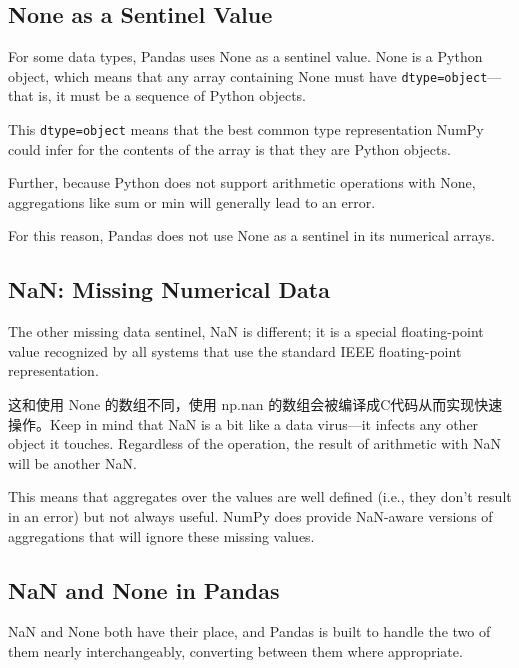 \subsection*{None as a Sentinel Value}
For some data types, Pandas uses None as a sentinel value. None is a Python object,
which means that any array containing None must have \verb|dtype=object|—that is, it
must be a sequence of Python objects.

This \verb|dtype=object| means that the best common type representation NumPy could
infer for the contents of the array is that they are Python objects. 

Further, because Python does not support arithmetic operations with None, aggregations like sum or min will generally lead to an error.

For this reason, Pandas does not use None as a sentinel in its numerical arrays.
\subsection*{NaN: Missing Numerical Data}

The other missing data sentinel, NaN is different; it is a special floating-point value
recognized by all systems that use the standard IEEE floating-point representation.

这和使用 None 的数组不同，使用 np.nan 的数组会被编译成C代码从而实现快速操作。Keep in mind that NaN is a bit like a data virus—it infects any other
object it touches. Regardless of the operation, the result of arithmetic with NaN will be another NaN.

This means that aggregates over the values are well defined (i.e., they don't result in
an error) but not always useful. NumPy does provide NaN-aware versions of aggregations that will ignore
these missing values.


\subsection*{NaN and None in Pandas}
NaN and None both have their place, and Pandas is built to handle the two of them
nearly interchangeably, converting between them where appropriate.

